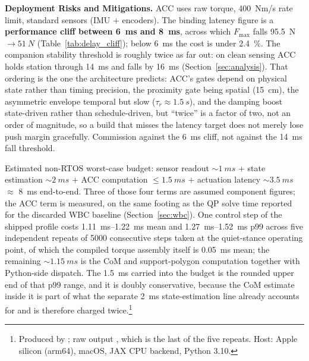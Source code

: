 \documentclass[a4paper,fleqn]{cas-dc}
\begin{document}
\textbf{Deployment Risks and Mitigations.}
ACC uses raw torque, \SI{400}{Nm/s} rate limit, standard sensors (IMU $+$ encoders). The binding latency figure is a \textbf{performance cliff between \SI{6}{ms} and \SI{8}{ms}}, across which $F_{\max}$ falls \SI{95.5}{N}${\rightarrow}\SI{51}{N}$ (Table~\ref{tab:delay_cliff}); below \SI{6}{ms} the cost is under \SI{2.4}{\percent}. The companion stability threshold is roughly twice as far out: on clean sensing ACC holds station through \SI{14}{ms} and falls by \SI{16}{ms} (Section~\ref{sec:analysis}). That ordering is the one the architecture predicts: ACC's gates depend on physical state rather than timing precision, the proximity gate being spatial (\SI{15}{cm}), the asymmetric envelope temporal but slow ($\tau_r{\approx}\SI{1.5}{s}$), and the damping boost state-driven rather than schedule-driven, but ``twice'' is a factor of two, not an order of magnitude, so a build that misses the latency target does not merely lose push margin gracefully. Commission against the \SI{6}{ms} cliff, not against the \SI{14}{ms} fall threshold.

Estimated non-RTOS worst-case budget: sensor readout ${\sim}\SI{1}{ms}$ $+$ state estimation ${\sim}\SI{2}{ms}$ $+$ ACC computation ${\le}\SI{1.5}{ms}$ $+$ actuation latency ${\sim}\SI{3.5}{ms}$ $\approx$ \SI{8}{ms} end-to-end. Three of those four terms are assumed component figures; the ACC term is measured, on the same footing as the QP solve time reported for the discarded WBC baseline (Section~\ref{sec:wbc}). One control step of the shipped profile costs \SIrange{1.11}{1.22}{ms} mean and \SIrange{1.27}{1.52}{ms} p99 across five independent repeats of \num{5000} consecutive steps taken at the quiet-stance operating point, of which the compiled torque assembly itself is \SI{0.05}{ms} mean; the remaining ${\sim}\SI{1.15}{ms}$ is the CoM and support-polygon computation together with Python-side dispatch. The \SI{1.5}{ms} carried into the budget is the rounded upper end of that p99 range, and it is doubly conservative, because the CoM estimate inside it is part of what the separate \SI{2}{ms} state-estimation line already accounts for and is therefore charged twice.\footnote{Produced by ; raw output , which is the last of the five repeats. Host: Apple silicon (arm64), macOS, JAX CPU backend, Python 3.10.}
\end{document}
